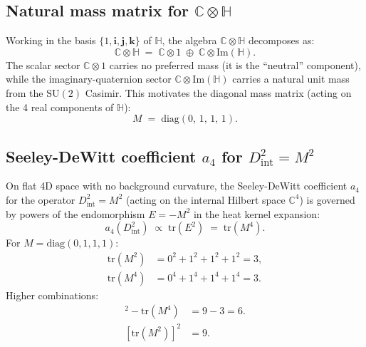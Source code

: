 \documentclass[11pt,a4paper]{article}
\theoremstyle{definition}
\theoremstyle{remark}
\begin{document}
\subsection{Natural mass matrix for $\mathbb{C}\otimes\mathbb{H}$}

Working in the basis $\{1, \mathbf{i}, \mathbf{j}, \mathbf{k}\}$ of $\mathbb{H}$,
the algebra $\mathbb{C}\otimes\mathbb{H}$ decomposes as:
\begin{equation}
  \mathbb{C}\otimes\mathbb{H}
  \;=\; \mathbb{C}\otimes 1 \;\oplus\; \mathbb{C}\otimes\mathrm{Im}(\mathbb{H}).
  \label{eq:CotimesH_basis}
\end{equation}
The scalar sector $\mathbb{C}\otimes 1$ carries no preferred mass
(it is the ``neutral'' component), while the imaginary-quaternion sector
$\mathbb{C}\otimes\mathrm{Im}(\mathbb{H})$ carries a natural unit mass from
the $\mathrm{SU}(2)$ Casimir.
This motivates the diagonal mass matrix (acting on the 4 real components of $\mathbb{H}$):
\begin{equation}
  M \;=\; \mathrm{diag}(0,\,1,\,1,\,1).
  \label{eq:M_natural}
\end{equation}

\subsection{Seeley-DeWitt coefficient $a_4$ for $D_{\mathrm{int}}^2 = M^2$}

On flat 4D space with no background curvature, the Seeley-DeWitt
coefficient $a_4$ for the operator $D_{\mathrm{int}}^2 = M^2$
(acting on the internal Hilbert space $\mathbb{C}^4$) is governed by
powers of the endomorphism $E = -M^2$ in the heat kernel expansion:
\begin{equation}
  a_4(D_{\mathrm{int}}^2)
  \;\propto\; \mathrm{tr}(E^2)
  \;=\; \mathrm{tr}(M^4).
  \label{eq:a4_M4}
\end{equation}
For $M = \mathrm{diag}(0,1,1,1)$:
\begin{align}
  \mathrm{tr}(M^2) &= 0^2 + 1^2 + 1^2 + 1^2 = 3, \label{eq:trM2} \\
  \mathrm{tr}(M^4) &= 0^4 + 1^4 + 1^4 + 1^4 = 3. \label{eq:trM4}
\end{align}
Higher combinations:
\begin{align}
  [\mathrm{tr}(M^2)]^2 - \mathrm{tr}(M^4) &= 9 - 3 = 6. \label{eq:trM2sq_minus_trM4} \\
  [\mathrm{tr}(M^2)]^2 &= 9. \label{eq:trM2sq}
\end{align}
\end{document}
